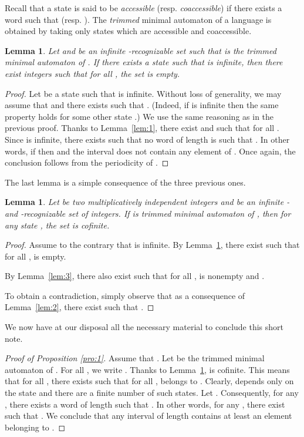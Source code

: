 \documentclass{beatcs}
\newtheorem{lemma}[proposition]{Lemma}
\begin{document}
Recall that a state  is said to be {\it accessible} (resp. {\it
  coaccessible}) if there exists a word  such that
 (resp. ). The {\it trimmed}
minimal automaton of a language  is obtained by taking only states
which are accessible and coaccessible.

\begin{lemma}\label{lem:4}
  Let  and  be an infinite
  -recognizable set such that
   is the trimmed minimal
  automaton of . If there exists a state  such that
   is infinite, then there exist integers
   such that for all , the set
   is empty.
\end{lemma}

\begin{proof}
  Let  be a state such that  is infinite.
  Without loss of generality, we may assume that  and there
  exists  such that . (Indeed, if
   is infinite then the same property
  holds for some other state .) We use the same reasoning as in the
  previous proof. Thanks to Lemma~\ref{lem:1}, there exist  and  such that 
  for all .  Since  is infinite,
  there exists  such that no word  of length  is
  such that . In other words, if  then
   and the interval  does
  not contain any element of . Once again, the conclusion follows
  from the periodicity of .
\end{proof}

The last lemma is a simple consequence of the three previous ones.

\begin{lemma}\label{lem:5}
  Let  be two multiplicatively independent integers and
   be an infinite - and -recognizable set
  of integers. If  is trimmed
  minimal automaton of , then for any state , the
  set  is cofinite.
\end{lemma}

\begin{proof}
    Assume to the contrary that  is infinite.
    By Lemma~\ref{lem:4}, there exist  such that for
    all ,  is
    empty.
    
    By Lemma~\ref{lem:3}, there also exist  such that for
    all ,  is nonempty
    and .
  
  
  
  To obtain a contradiction, simply observe that as a consequence of
  Lemma~\ref{lem:2}, there exist  such that
  .
\end{proof}

We now have at our disposal all the necessary material to conclude
this short note.
\begin{proof}[Proof of Proposition \ref{pro:1}]
  Assume that . Let  be the
  trimmed minimal automaton of . For all , we write
  .  Thanks to Lemma~\ref{lem:5},
   is cofinite. This means that for all , there
  exists  such that for all ,  belongs to .
  Clearly,  depends only on the state  and there are a
  finite number of such states. Let . Consequently, for
  any , there exists a word  of length  such that
  . In other words, for any , there
  exist  such that . We conclude that
  any interval of length  contains at least an element belonging
  to .
\end{proof}
\end{document}
